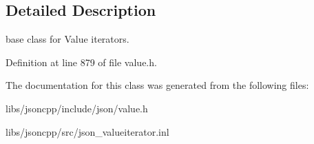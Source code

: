 \subsection{Detailed Description}
base class for Value iterators. 

\begin{DoxyVerb} \end{DoxyVerb}
 

Definition at line 879 of file value.\-h.



The documentation for this class was generated from the following files\-:\begin{DoxyCompactItemize}
\item 
libs/jsoncpp/include/json/value.\-h\item 
libs/jsoncpp/src/json\-\_\-valueiterator.\-inl\end{DoxyCompactItemize}
